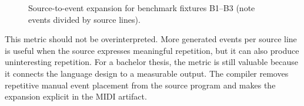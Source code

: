\begin{figure}[htbp]
  \centering
  \caption{Source-to-event expansion for benchmark fixtures B1--B3 (note events divided by source lines).}%
  \label{fig:compression-chart}
\end{figure}

This metric should not be overinterpreted.
More generated events per source line is useful when the source expresses meaningful repetition, but it can also produce
uninteresting repetition.
For a bachelor thesis, the metric is still valuable because it connects the language design to a measurable output.
The compiler removes repetitive manual event placement from the source program and makes the expansion explicit in the
MIDI artifact.
